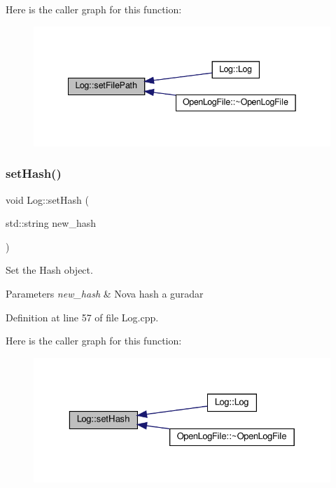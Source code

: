 Here is the caller graph for this function\+:
\nopagebreak
\begin{figure}[H]
\begin{center}
\leavevmode
\includegraphics[width=342pt]{d6/d70/class_log_ab5f872112a7932749aa07c1ba649020a_icgraph}
\end{center}
\end{figure}
\mbox{\label{class_log_a15f1680044aef009232b513648a95901}} 
\subsubsection{\texorpdfstring{set\+Hash()}{setHash()}}
{\footnotesize\ttfamily void Log\+::set\+Hash (\begin{DoxyParamCaption}\item[{std\+::string}]{new\+\_\+hash }\end{DoxyParamCaption})}



Set the Hash object. 


\begin{DoxyParams}{Parameters}
{\em new\+\_\+hash} & Nova hash a guradar \\
\hline
\end{DoxyParams}


Definition at line 57 of file Log.\+cpp.

Here is the caller graph for this function\+:
\nopagebreak
\begin{figure}[H]
\begin{center}
\leavevmode
\includegraphics[width=329pt]{d6/d70/class_log_a15f1680044aef009232b513648a95901_icgraph}
\end{center}
\end{figure}


